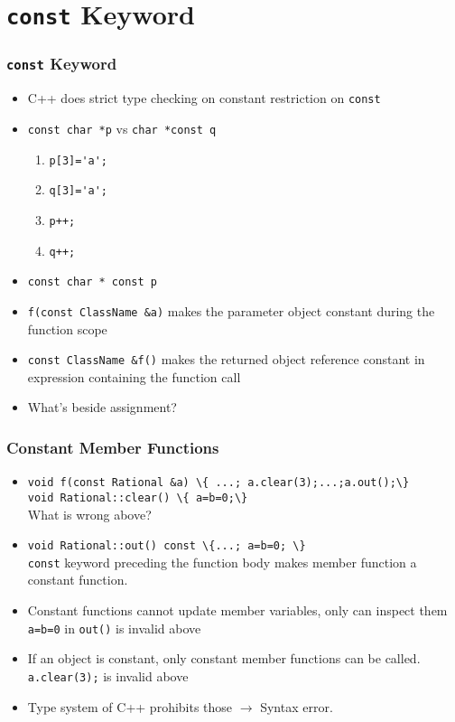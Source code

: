 \section{\texttt{const} Keyword}
\begin{frame}
\frametitle{\texttt{const} Keyword}
\begin{itemize}
\item C++ does strict type checking on constant restriction on \lstinline!const! 
\item \lstinline!const char *p! vs \lstinline!char *const q!\\
\begin{enumerate}
      \item \lstinline!p[3]='a';! 
      \item \lstinline!q[3]='a';! \only<2->{{\OK}}
      \item \lstinline!p++;! 
      \item \lstinline!q++;! 
\end{enumerate}
\item \lstinline!const char * const p!
\item \lstinline!f(const ClassName &a)! makes the parameter object constant during the
	function scope
\item \lstinline!const ClassName &f()! makes the returned object reference constant
	in expression containing the function call
\item What's beside assignment? 
\end{itemize}
\end{frame}

\begin{frame}
\frametitle{Constant Member Functions}
\begin{itemize}[<+->]
\item \lstinline!void f(const Rational &a) \{ ...; a.clear(3);...;a.out();\}!\\
      \lstinline!void Rational::clear() \{ a=b=0;\}!\\
	What is wrong above?
\item \lstinline!void Rational::out() const \{...; a=b=0; \}!\\
	\texttt{const} keyword preceding the function body makes member function a constant
	function.
\item Constant functions cannot update member variables, only can inspect them\\
	\alert{\texttt{a=b=0} in \texttt{out()} is invalid above}
\item If an object is constant, only constant member functions can be called.\\
	\alert{\texttt{a.clear(3);} is invalid above}
\item Type system of C++ prohibits those $\rightarrow$ Syntax error.
\end{itemize}
\end{frame}

